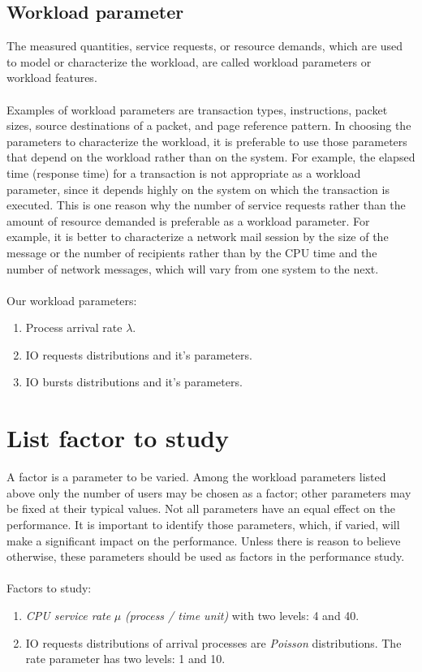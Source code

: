 \documentclass[13pt,a4paper]{article}
\begin{document}
		\subsection{Workload parameter}
			The measured quantities, service requests, or resource demands, which are used to model or characterize the workload, are called workload parameters or workload features.\\ \\
			Examples of workload parameters are transaction types, instructions, packet sizes, source destinations of a packet, and page reference pattern. In choosing the parameters to characterize the workload, it is preferable to use those parameters that depend on the workload rather than on the system. For example, the elapsed time (response time) for a transaction is not appropriate as a workload parameter, since it depends highly on the system on which the transaction is executed. This is one reason why the number of service requests rather than the amount of resource demanded is preferable as a workload parameter. For example, it is better to characterize a network mail session by the size of the message or the number of recipients rather than by the CPU time and the number of network messages, which will vary from one system to the next. \\ \\
			Our workload parameters:
			\begin{enumerate}[-]
				\item Process arrival rate $\lambda$.
				\item IO requests distributions and it’s parameters.
				\item IO bursts distributions and it’s parameters.
			\end{enumerate}
	\section{List factor to study}
		A factor is a parameter to be varied. Among the workload parameters listed above only the number of users may be chosen as a factor; other parameters may be fixed at their typical values. Not all parameters have an equal effect on the performance. It is important to identify those parameters, which, if varied, will make a significant impact on the performance. Unless there is reason to believe otherwise, these parameters should be used as factors in the performance study. \\ \\
		Factors to study:
		\begin{enumerate}[-]
			\item \textit{CPU service rate} $\mu$ \textit{(process / time unit)} with two levels: 4 and 40.
			\item IO requests distributions of arrival processes are \textit{Poisson} distributions. The rate parameter has two levels: 1 and 10.
		\end{enumerate}
\end{document}

